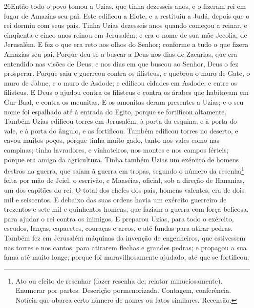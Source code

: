 \lettrine{26} Então todo o povo tomou a Uzias, que tinha
dezesseis anos, e o fizeram rei em lugar de Amazias seu pai.
Este edificou a Elote, e a restituiu a Judá, depois que o rei
dormiu com seus pais. Tinha Uzias dezesseis anos quando começou
a reinar, e cinqüenta e cinco anos reinou em Jerusalém; e era o nome
de sua mãe Jecolia, de Jerusalém. E fez o que era reto aos olhos
do Senhor; conforme a tudo o que fizera Amazias seu pai. Porque
deu-se a buscar a Deus nos dias de Zacarias, que era entendido nas
visões de Deus; e nos dias em que buscou ao Senhor, Deus o fez
prosperar. Porque saiu e guerreou contra os filisteus, e quebrou
o muro de Gate, o muro de Jabne, e o muro de Asdode; e edificou
cidades em Asdode, e entre os filisteus. E Deus o ajudou contra
os filisteus e contra os árabes que habitavam em Gur-Baal, e contra
os meunitas. E os amonitas deram presentes a Uzias; e o seu nome
foi espalhado até à entrada do Egito, porque se fortificou
altamente. Também Uzias edificou torres em Jerusalém, à porta da
esquina, e à porta do vale, e à porta do ângulo, e as fortificou.
Também edificou torres no deserto, e cavou muitos poços,
porque tinha muito gado, tanto nos vales como nas campinas; tinha
lavradores, e vinhateiros, nos montes e nos campos férteis; porque
era amigo da agricultura. Tinha também Uzias um exército de
homens destros na guerra, que saíam à guerra em tropas, segundo o
número da resenha\footnote{Ato ou efeito de resenhar (fazer resenha
de; relatar minuciosamente). Enumerar por partes. Descrição
pormenorizada. Contagem, conferência. Notícia que abarca certo
número de nomes ou fatos similares. Recensão.} feita por mão de
Jeiel, o escrivão, e Maaséias, oficial, sob a direção de Hananias,
um dos capitães do rei. O total dos chefes dos pais, homens
valentes, era de dois mil e seiscentos. E debaixo das suas
ordens havia um exército guerreiro de trezentos e sete mil e
quinhentos homens, que faziam a guerra com força belicosa, para
ajudar o rei contra os inimigos. E preparou Uzias, para todo
o exército, escudos, lanças, capacetes, couraças e arcos, e até
fundas para atirar pedras. Também fez em Jerusalém máquinas
da invenção de engenheiros, que estivessem nas torres e nos cantos,
para atirarem flechas e grandes pedras; e propagou a sua fama até
muito longe; porque foi maravilhosamente ajudado, até que se
fortificou.

